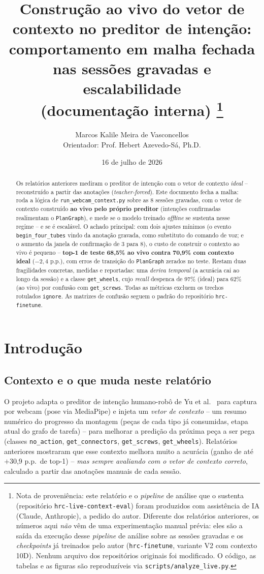 \documentclass[11pt]{article}
\title{
  Construção ao vivo do vetor de contexto no preditor de intenção:\\
  \large comportamento em malha fechada nas sessões gravadas e escalabilidade\\
  \normalsize (documentação interna)%
  \thanks{Nota de proveniência: este relatório e o \emph{pipeline} de análise
  que o sustenta (repositório \texttt{hrc-live-context-eval}) foram produzidos
  com assistência de IA (Claude, Anthropic), a pedido do autor. Diferente dos
  relatórios anteriores, os números aqui \emph{não} vêm de uma experimentação
  manual prévia: eles são a saída da execução desse \emph{pipeline} de análise
  sobre as sessões gravadas e os \emph{checkpoints} já treinados pelo autor
  (\texttt{hrc-finetune}, variante V2 com contexto 10D). Nenhum arquivo dos
  repositórios originais foi modificado. O código, as tabelas e as figuras são
  reproduzíveis via \texttt{scripts/analyze\_live.py}.}
}
\author{Marcos Kalile Meira de Vasconcellos \\ Orientador: Prof. Hebert Azevedo-Sá, Ph.D.}
\date{16 de julho de 2026}
\begin{document}
\maketitle

\begin{abstract}
\noindent
Os relatórios anteriores mediram o preditor de intenção com o vetor de contexto
\emph{ideal} -- reconstruído a partir das anotações (\emph{teacher-forced}).
Este documento fecha a malha: roda a lógica de \texttt{run\_webcam\_context.py}
sobre as 8 sessões gravadas, com o vetor de contexto construído \textbf{ao vivo
pelo próprio preditor} (intenções confirmadas realimentam o \texttt{PlanGraph}),
e mede se o modelo treinado \emph{offline} se sustenta nesse regime -- e se é
escalável. O achado principal: com dois ajustes mínimos (o evento
\texttt{begin\_four\_tubes} vindo da anotação gravada, como substituto do
comando de voz; e o aumento da janela de confirmação de 3 para 8), o custo de
construir o contexto ao vivo é pequeno -- \textbf{top-1 de teste 68,5\% ao vivo
contra 70,9\% com contexto ideal} ($-2{,}4$ p.p.), com erros de transição do
\texttt{PlanGraph} zerados no teste. Restam duas fragilidades concretas, medidas
e reportadas: uma \emph{deriva temporal} (a acurácia cai ao longo da sessão) e a
classe \texttt{get\_wheels}, cujo \emph{recall} despenca de 97\% (ideal) para
62\% (ao vivo) por confusão com \texttt{get\_screws}. Todas as métricas excluem
os trechos rotulados \texttt{ignore}. As matrizes de confusão seguem o padrão do
repositório \texttt{hrc-finetune}.
\end{abstract}

\tableofcontents
\bigskip

\section{Introdução}
\label{sec:intro}

\subsection{Contexto e o que muda neste relatório}
\label{sec:contexto}

O projeto adapta o preditor de intenção humano-robô de Yu et al.~\cite{yu2025}
para captura por webcam (pose via MediaPipe) e injeta um \emph{vetor de contexto}
-- um resumo numérico do progresso da montagem (peças de cada tipo já
consumidas, etapa atual do grafo de tarefa) -- para melhorar a predição da
próxima peça a ser pega (classes \texttt{no\_action}, \texttt{get\_connectors},
\texttt{get\_screws}, \texttt{get\_wheels}). Relatórios anteriores mostraram que
esse contexto melhora muito a acurácia (ganho de até $+$30,9 p.p.\ de top-1) --
\emph{mas sempre avaliando com o vetor de contexto correto}, calculado a partir
das anotações manuais de cada sessão.
\end{document}
